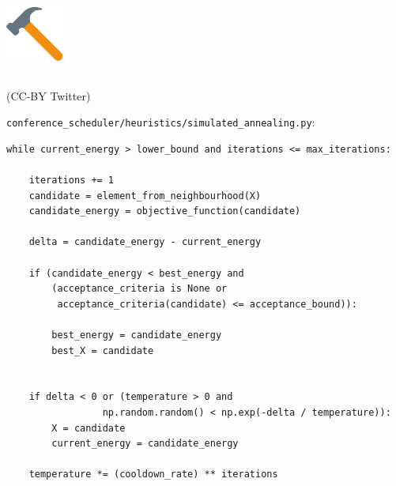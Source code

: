 \documentclass{beamer}
\begin{document}
\begin{frame}
\begin{columns}
            \begin{column}{.3\textwidth}
                \centering
                \includegraphics[width=.95\textwidth]{./static/hammer_twemoji.pdf}
            \end{column}

        \end{columns}

            \hfill\tiny{(CC-BY Twitter)}
    \end{frame}

    \begin{frame}[fragile]{}
        \centering
        \texttt{conference\_scheduler/heuristics/simulated\_annealing.py}:

        \scriptsize
        \begin{verbatim}
while current_energy > lower_bound and iterations <= max_iterations:

    iterations += 1
    candidate = element_from_neighbourhood(X)
    candidate_energy = objective_function(candidate)

    delta = candidate_energy - current_energy

    if (candidate_energy < best_energy and
        (acceptance_criteria is None or
         acceptance_criteria(candidate) <= acceptance_bound)):

        best_energy = candidate_energy
        best_X = candidate


    if delta < 0 or (temperature > 0 and
                 np.random.random() < np.exp(-delta / temperature)):
        X = candidate
        current_energy = candidate_energy

    temperature *= (cooldown_rate) ** iterations

        \end{verbatim}
\end{frame}
\end{document}

